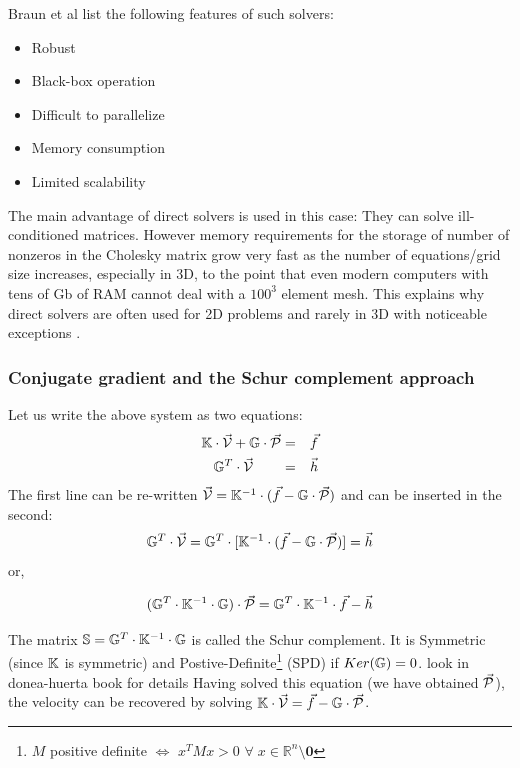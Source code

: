 Braun et al \cite{brtf08} list the following features of such solvers:
\begin{itemize}
\item Robust
\item Black-box operation
\item Difficult to parallelize
\item Memory consumption
\item Limited scalability
\end{itemize}

The main advantage of direct solvers is used in this case: They can solve ill-conditioned 
matrices. However memory requirements for the storage of number of nonzeros in the 
Cholesky matrix grow very fast as the number of equations/grid size increases, especially in 3D,
to the point that even modern computers with tens of Gb of RAM cannot deal with a $100^3$ element mesh.
This explains why direct solvers are often used for 2D problems and rarely in 3D with noticeable 
exceptions \cite{thfb08,yahb09,brya09,lobh10,alht11,alht12,alhf13,whbb14,neew18}. 


\subsubsection{Conjugate gradient and the Schur complement approach }






Let us write the above system as two equations:
\begin{eqnarray}
{\mathbb{K}} \cdot \vec{\cal V} + {\mathbb{G}} \cdot \vec{\cal P} &=& \vec{f} \\
{\mathbb{G}}^T \cdot  \vec{\cal V} \quad\quad &=& \vec{h} 
\end{eqnarray}
The first line can be re-written $\vec{\cal V}={\mathbb{K}}^{-1}\cdot (\vec{f} - {\mathbb{G}} \cdot \vec{\cal P})$ and can be inserted in the second:
\begin{equation}
{\mathbb{G}}^T\cdot \vec{\cal V} ={\mathbb{G}}^T \cdot  [ {\mathbb{K}}^{-1} \cdot  (\vec{f} - {\mathbb{G}} \cdot  \vec{\cal P}) ] = \vec{h} 
\end{equation}
or, 
\begin{mdframed}[backgroundcolor=blue!5]
\begin{equation}
({\mathbb{G}}^T \cdot {\mathbb{K}}^{-1} \cdot {\mathbb{G}}) \cdot \vec{\cal P} = {\mathbb{G}}^T \cdot {\mathbb{K}}^{-1}\cdot \vec{f} - \vec{h} 
\end{equation}
\end{mdframed}
The matrix ${\mathbb{S}}= {\mathbb{G}}^T \cdot {\mathbb{K}}^{-1} \cdot {\mathbb{G}} $ is called the Schur complement.  
It is Symmetric (since ${\mathbb{K}}$ is symmetric) and  Postive-Definite\footnote{$M$ 
positive definite $\iff$ $x^TMx>0$ $\forall \; x\in \mathbb{R}^n \setminus {\bm 0}$ }
(SPD)  if $Ker({{\mathbb{G}}})=0$. 
{\color{red} look in donea-huerta book for details}
Having solved this equation (we have obtained $\vec{\cal P}$), the velocity can be recovered by solving 
${\mathbb{K}}\cdot \vec{\cal V} =\vec{f}- {\mathbb{G}} \cdot \vec{\cal P}$. 

